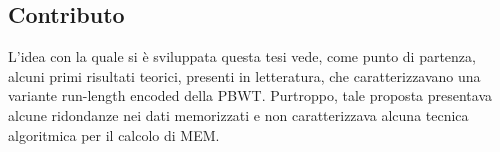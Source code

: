 \documentclass[a4paper,11pt, oneside,italian]{article}
\begin{document}
\subsection*{Contributo}
L'idea con la quale si è sviluppata questa tesi vede, come punto di partenza,
alcuni primi risultati teorici, presenti in letteratura, che caratterizzavano
una variante run-length encoded della PBWT. Purtroppo, tale proposta presentava
alcune ridondanze nei dati memorizzati e non caratterizzava alcuna tecnica
algoritmica per il calcolo di MEM.
\end{document}
